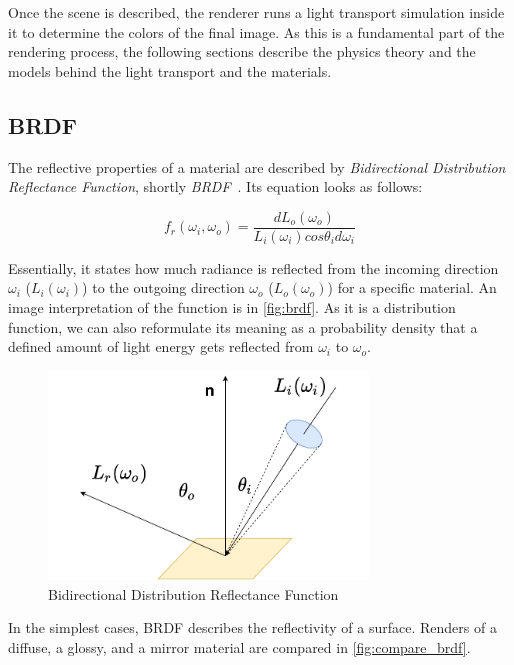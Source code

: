 Once the scene is described, the renderer runs a light transport simulation inside it to determine the colors of the final image. As this is a fundamental part of the rendering process, the following sections describe the physics theory and the models behind the light transport and the materials.

\subsection{BRDF}
\label{sec:BRDF}

The reflective properties of a material are described by \emph{Bidirectional Distribution Reflectance Function}, shortly \emph{BRDF}~\cite{nicodemus1965directional}. Its equation looks as follows:

\begin{equation} \label{eq:brdf}
f_r(\omega_i,\omega_o)=\frac{dL_o(\omega_o)}{L_i(\omega_i)cos\theta_i d\omega_i}
\end{equation}

Essentially, it states how much radiance is reflected from the incoming direction $\omega_i$ ($L_i(\omega_i)$) to the outgoing direction $\omega_o$ ($L_o(\omega_o)$) for a specific material.
An image interpretation of the function is in \autoref{fig:brdf}. As it is a distribution function, we can also reformulate its meaning as a probability density that a defined amount of light energy gets reflected from $\omega_i$ to $\omega_o$.

\begin{figure}[h]
	\centering
	\includegraphics[width=85mm]{img/brdf.pdf}
	\caption{Bidirectional Distribution Reflectance Function}
	\label{fig:brdf}
\end{figure}

In the simplest cases, BRDF describes the reflectivity of a surface. Renders of a diffuse, a glossy, and a mirror material are compared in \autoref{fig:compare_brdf}.

